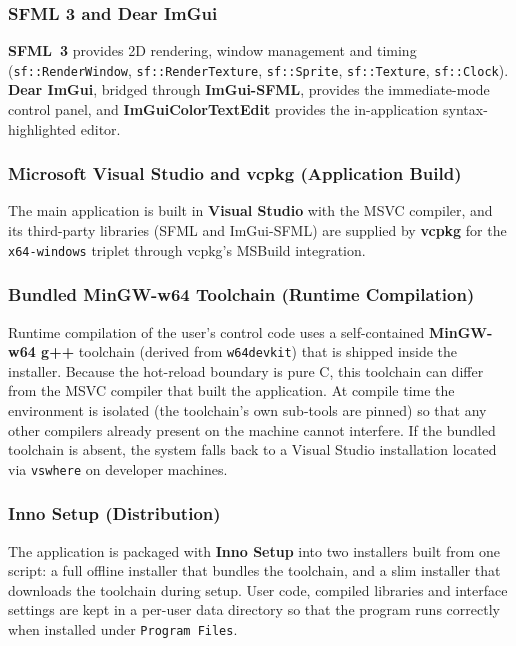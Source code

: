 \subsubsection{SFML 3 and Dear ImGui}
\textbf{SFML~3} provides 2D rendering, window management and timing (\texttt{sf::RenderWindow}, \texttt{sf::RenderTexture}, \texttt{sf::Sprite}, \texttt{sf::Texture}, \texttt{sf::Clock}). \textbf{Dear ImGui}, bridged through \textbf{ImGui-SFML}, provides the immediate-mode control panel, and \textbf{ImGuiColorTextEdit} provides the in-application syntax-highlighted editor.

\subsubsection{Microsoft Visual Studio and vcpkg (Application Build)}
The main application is built in \textbf{Visual Studio} with the MSVC compiler, and its third-party libraries (SFML and ImGui-SFML) are supplied by \textbf{vcpkg} for the \texttt{x64-windows} triplet through vcpkg's MSBuild integration.

\subsubsection{Bundled MinGW-w64 Toolchain (Runtime Compilation)}
Runtime compilation of the user's control code uses a self-contained \textbf{MinGW-w64 g++} toolchain (derived from \texttt{w64devkit}) that is shipped inside the installer. Because the hot-reload boundary is pure C, this toolchain can differ from the MSVC compiler that built the application. At compile time the environment is isolated (the toolchain's own sub-tools are pinned) so that any other compilers already present on the machine cannot interfere. If the bundled toolchain is absent, the system falls back to a Visual Studio installation located via \texttt{vswhere} on developer machines.

\subsubsection{Inno Setup (Distribution)}
The application is packaged with \textbf{Inno Setup} into two installers built from one script: a full offline installer that bundles the toolchain, and a slim installer that downloads the toolchain during setup. User code, compiled libraries and interface settings are kept in a per-user data directory so that the program runs correctly when installed under \texttt{Program Files}.

